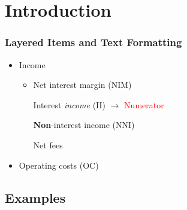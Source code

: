 \documentclass[12pt,aspectratio=169,xcolor=dvipsnames,hyperref={colorlinks=true,linkcolor=blue,citecolor=black}]{beamer}
\title[]{}
\subtitle[]{Subtitle of the Paper}
\author[]{  \hspace{-1.4ex}\inst{1} \and  \hspace{-1.4ex}\inst{2} }
\institute[]{ \inst{1}  \and \inst{2}  }
\date[]{Month Day, Year}
\begin{document}
\maketitle
{}


\section[]{Introduction}

\begin{frame}[label=layered]
	\frametitle{Layered Items and Text Formatting}
	\begin{itemize}
		\item Income \quad \cmark
		\begin{itemize}
			\item \alert{Net interest margin} (NIM)
			\begin{itemize}
				\iftoggle{struct}{\item<2->}{\item} Interest \textit{income} (II) \(\rightarrow\) \textcolor{red}{Numerator}
			\end{itemize}
			\iftoggle{struct}{\item<1->}{\item} \textbf{Non}-interest income (NNI)
			\begin{itemize}
				\iftoggle{stops}{\item<2>}{\item} \textrm{Net fees}
			\end{itemize}
		\end{itemize}
		\item Operating costs (OC) \quad \xmark
	\end{itemize}
\end{frame}


\subsection[]{Examples}
\end{document}
